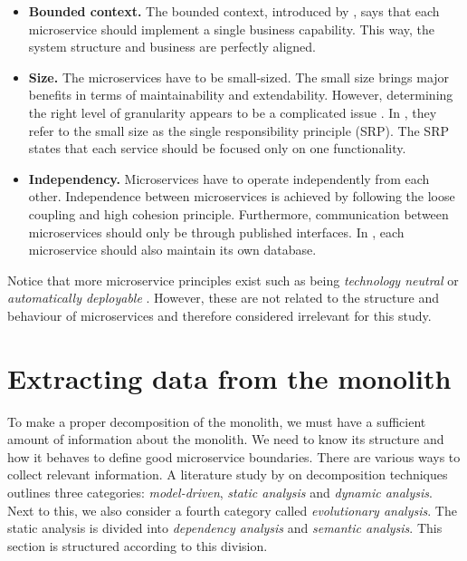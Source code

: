 \begin{itemize}
    \item \textbf{Bounded context.} The bounded context, introduced by \citeauthor{evans2004domain} \cite{evans2004domain}, says that each microservice should implement a single business capability. This way, the system structure and business are perfectly aligned.
    \item \textbf{Size.} The microservices have to be small-sized. The small size brings major benefits in terms of maintainability and extendability. However, determining the right level of granularity appears to be a complicated issue \cite{di2018migrating, kalske2017challenges, newman2015building}. In \cite{newman2015building, selmadji2018re}, they refer to the small size as the single responsibility principle (SRP). The SRP states that each service should be focused only on one functionality.
    \item \textbf{Independency.} Microservices have to operate independently from each other. Independence between microservices is achieved by following the loose coupling and high cohesion principle. Furthermore, communication between microservices should only be through published interfaces. In \cite{selmadji2018re}, each microservice should also maintain its own database. 
\end{itemize}

Notice that more microservice principles exist such as being \textit{technology neutral} or \textit{automatically deployable} \cite{selmadji2018re}. However, these are not related to the structure and behaviour of microservices and therefore considered irrelevant for this study. \par

\section{Extracting data from the monolith}\label{s:information_views}
To make a proper decomposition of the monolith, we must have a sufficient amount of information about the monolith. We need to know its structure and how it behaves to define good microservice boundaries. There are various ways to collect relevant information. A literature study by \citeauthor{ponce2019migrating} on decomposition techniques outlines three categories: \textit{model-driven}, \textit{static analysis} and \textit{dynamic analysis}. Next to this, we also consider a fourth category called \textit{evolutionary analysis}. The static analysis is divided into \textit{dependency analysis} and \textit{semantic analysis}. This section is structured according to this division.

